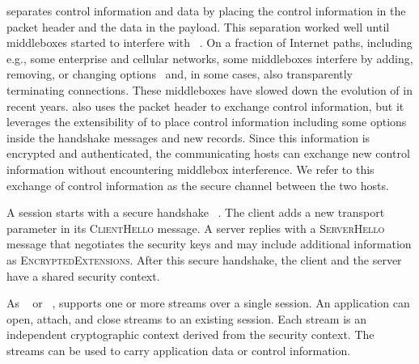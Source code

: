 
\tcp separates control information and data by placing the control information
in the packet header and the data in the payload. This separation worked well
until middleboxes started to interfere with \tcp~\cite{10.1145/1064413.1064418,
honda2011still, detal2013revealing}.  On a fraction of Internet paths, including e.g., some enterprise and cellular networks, some middleboxes interfere by adding, removing, or changing \tcp options~\cite{wang2011untold, honda2011still,xu2015investigating} and, in some cases, also transparently terminating \tcp connections. These middleboxes have slowed down the evolution of \tcp in recent years. \tcpls also uses the packet header to exchange \tcp control information, but it leverages the extensibility of  to place control information including some \tcp options inside the \tls handshake messages and new \tls records. Since this information is encrypted and authenticated, the communicating hosts can exchange new control information without encountering middlebox interference. We refer to this exchange of control information as the secure channel between the two hosts.

A \tcpls session starts with a secure  handshake ~\cite{rfc8446}. The
client adds a new \tcpls transport parameter in its \textsc{ClientHello} message. A \tcpls server replies with a \textsc{ServerHello} message that negotiates the security keys and may include additional \tcpls information as
\textsc{EncryptedExtensions}. After this secure handshake, the client and the
server have a shared security context.

As \sctp~\cite{rfc4960} or \quic~\cite{draft-ietf-quic-transport}, \tcpls
supports one or more streams over a single \tcpls session. An application
can open, attach, and close streams to an existing \tcpls session. Each
stream is an independent cryptographic context derived from the \tcpls
security context. The \tcpls streams can be used to carry application data
or control information.


